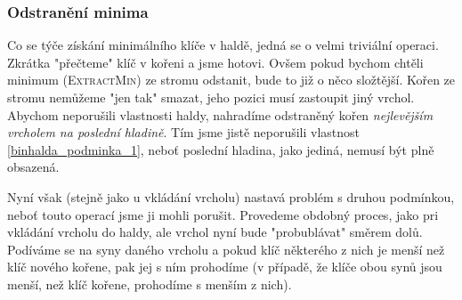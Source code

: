 \subsubsection{Odstranění minima}

Co se týče získání minimálního klíče v haldě, jedná se o velmi triviální operaci. Zkrátka "přečteme" klíč v kořeni a jsme hotovi. Ovšem pokud bychom chtěli minimum (\textsc{ExtractMin}) ze stromu odstanit, bude to již o něco složtější. Kořen ze stromu nemůžeme "jen tak" smazat, jeho pozici musí zastoupit jiný vrchol. Abychom neporušili vlastnosti haldy, nahradíme odstraněný kořen \emph{nejlevějším vrcholem na poslední hladině}. Tím jsme jistě neporušili vlastnost \ref{binhalda_podminka_1}, neboť poslední hladina, jako jediná, nemusí být plně obsazená.

Nyní však (stejně jako u vkládání vrcholu) nastavá problém s druhou podmínkou, neboť touto operací jsme ji mohli porušit. Provedeme obdobný proces, jako pri vkládání vrcholu do haldy, ale vrchol nyní bude "probublávat" směrem dolů. Podíváme se na syny daného vrcholu a pokud klíč některého z nich je menší než klíč nového kořene, pak jej s ním prohodíme (v případě, že klíče obou synů jsou menší, než klíč kořene, prohodíme s menším z nich).
